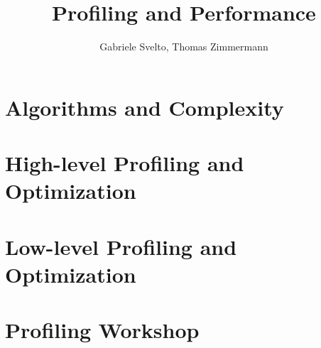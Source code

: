 \documentclass{beamer}
\author{Gabriele Svelto, Thomas Zimmermann}
\title{Profiling and Performance}
\begin{document}
 \frame{\titlepage}

 \begin{frame}
  \tableofcontents
 \end{frame}

 \section[algo]{Algorithms and Complexity}

 \begin{frame}
  \tableofcontents[currentsection]
 \end{frame}

 

 \section[highlevel]{High-level Profiling and Optimization}

 \begin{frame}
  \tableofcontents[currentsection]
 \end{frame}

 

 \section[lowlevel]{Low-level Profiling and Optimization}

 \begin{frame}
  \tableofcontents[currentsection]
 \end{frame}

 

 \section[profiling]{Profiling Workshop}

 \begin{frame}
  \tableofcontents[currentsection]
 \end{frame}

 
\end{document}
